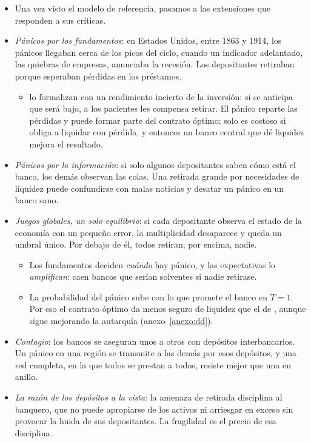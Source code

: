 \documentclass[11pt]{article}
\begin{document}
\begin{itemize}
\item Una vez visto el modelo de referencia, pasamos a las extensiones que responden a sus críticas.
\item \emph{Pánicos por los fundamentos}: en Estados Unidos, entre 1863 y 1914, los pánicos llegaban cerca de los picos del ciclo, cuando un indicador adelantado, las quiebras de empresas, anunciaba la recesión. Los depositantes retiraban porque esperaban pérdidas en los préstamos\nocite{Gorton1988Banking}.
  \begin{itemize}
  \item \textcite{AllenGale1998Optimal} lo formalizan con un rendimiento incierto de la inversión: si se anticipa que será bajo, a los pacientes les compensa retirar. El pánico reparte las pérdidas y puede formar parte del contrato óptimo; solo es costoso si obliga a liquidar con pérdida, y entonces un banco central que dé liquidez mejora el resultado.
  \end{itemize}
\item \emph{Pánicos por la información}: si solo algunos depositantes saben cómo está el banco, los demás observan las colas. Una retirada grande por necesidades de liquidez puede confundirse con malas noticias y desatar un pánico en un banco sano\nocite{ChariJagannathan1988,JacklinBhattacharya1988}.
\item \emph{Juegos globales, un solo equilibrio}: si cada depositante observa el estado de la economía con un pequeño error, la multiplicidad desaparece y queda un umbral único. Por debajo de él, todos retiran; por encima, nadie\nocite{GoldsteinPauzner2005}.
  \begin{itemize}
  \item Los fundamentos deciden \emph{cuándo} hay pánico, y las expectativas lo \emph{amplifican}: caen bancos que serían solventes si nadie retirase.
  \item La probabilidad del pánico sube con lo que promete el banco en $T=1$. Por eso el contrato óptimo da menos seguro de liquidez que el de \textcite{DiamondDybvig1983Bank}, aunque sigue mejorando la autarquía (anexo~\ref{anexo:dd}).
  \end{itemize}
\item \emph{Contagio}: los bancos se aseguran unos a otros con depósitos interbancarios. Un pánico en una región se transmite a las demás por esos depósitos, y una red completa, en la que todos se prestan a todos, resiste mejor que una en anillo\nocite{AllenGale2000Contagion}.
\item \emph{La razón de los depósitos a la vista}: la amenaza de retirada disciplina al banquero, que no puede apropiarse de los activos ni arriesgar en exceso sin provocar la huida de sus depositantes\nocite{CalomirisKahn1991,DiamondRajan2001}. La fragilidad es el precio de esa disciplina.

\end{itemize}
\end{document}
